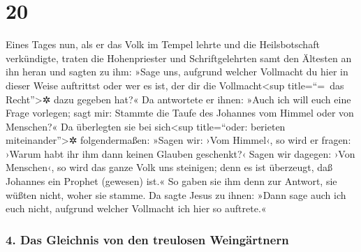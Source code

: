 \hypertarget{section-19}{%
\section{20}\label{section-19}}

 Eines Tages nun, als er das Volk im Tempel lehrte und die
Heilsbotschaft verkündigte, traten die Hohenpriester und
Schriftgelehrten samt den Ältesten an ihn heran  und
sagten zu ihm: »Sage uns, aufgrund welcher Vollmacht du hier in dieser
Weise auftrittst oder wer es ist, der dir die Vollmacht\textless sup
title=``=~das Recht''\textgreater✲ dazu gegeben hat?«  Da
antwortete er ihnen: »Auch ich will euch eine Frage vorlegen; sagt mir:
 Stammte die Taufe des Johannes vom Himmel oder von
Menschen?«  Da überlegten sie bei sich\textless sup
title=``oder: berieten miteinander''\textgreater✲ folgendermaßen: »Sagen
wir: ›Vom Himmel‹, so wird er fragen: ›Warum habt ihr ihm dann keinen
Glauben geschenkt?‹  Sagen wir dagegen: ›Von Menschen‹, so
wird das ganze Volk uns steinigen; denn es ist überzeugt, daß Johannes
ein Prophet (gewesen) ist.«  So gaben sie ihm denn zur
Antwort, sie wüßten nicht, woher sie stamme.  Da sagte
Jesus zu ihnen: »Dann sage auch ich euch nicht, aufgrund welcher
Vollmacht ich hier so auftrete.«

\hypertarget{das-gleichnis-von-den-treulosen-weinguxe4rtnern}{%
\subsubsection{4. Das Gleichnis von den treulosen
Weingärtnern}\label{das-gleichnis-von-den-treulosen-weinguxe4rtnern}}

